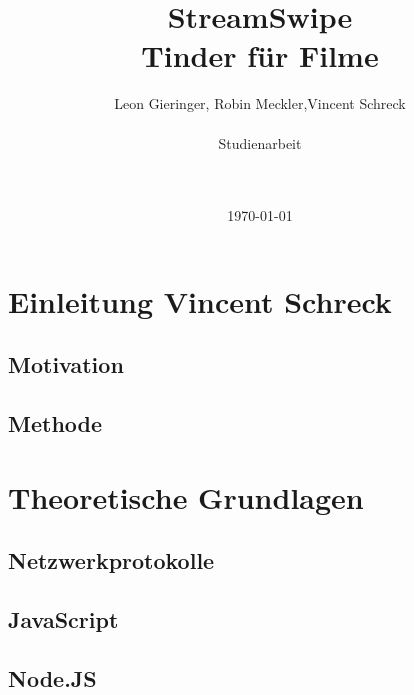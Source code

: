 \documentclass[11pt,a4paper]{article}
\title{StreamSwipe\\Tinder für Filme\vspace{10px}}
\author{Leon Gieringer, Robin Meckler,Vincent Schreck \\ \\ Studienarbeit \\ \\ \\}
\date{\today}
\begin{document}
\maketitle
\thispagestyle{empty}
\newpage
{}
\tableofcontents
\newpage
\listoffigures
\newpage
\lstlistoflistings
\newpage
{}



\pagestyle{fancy}
\fancyhf{}
\setlength{\headheight}{35pt}

\renewcommand\headrulewidth{0.4pt}

\fancyhead[LE,RO]{\rightmark}%
\renewcommand{\sectionmark}[1]{\markright{#1}}
\renewcommand{\subsectionmark}[1]{\markright{#1}}
\renewcommand{\subsubsectionmark}[1]{\markright{#1}}

\cfoot{\thepage}
\newpage


\section[Einleitung]{Einleitung \hfill \normalfont \small{Vincent Schreck}}

\subsection{Motivation}

\subsection{Methode}

\clearpage

\section{Theoretische Grundlagen}
\subsection{Netzwerkprotokolle}

\newpage
\subsection{JavaScript}

\newpage
\subsection{Node.JS}

\newpage
\end{document}
